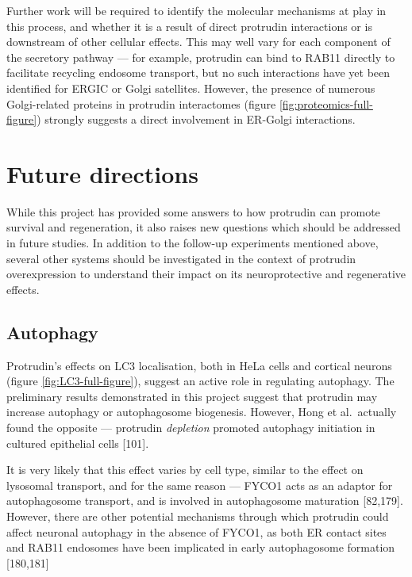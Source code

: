 \documentclass[
  12pt,
  a4paper,
]{book}
\begin{document}
Further work will be required to identify the molecular mechanisms at play in this process, and whether it is a result of direct protrudin interactions or is downstream of other cellular effects. This may well vary for each component of the secretory pathway --- for example, protrudin can bind to RAB11 directly to facilitate recycling endosome transport, but no such interactions have yet been identified for ERGIC or Golgi satellites. However, the presence of numerous Golgi-related proteins in protrudin interactomes (figure \ref{fig:proteomics-full-figure}) strongly suggests a direct involvement in ER-Golgi interactions.

\hypertarget{future-directions}{%
\section{Future directions}\label{future-directions}}

While this project has provided some answers to how protrudin can promote survival and regeneration, it also raises new questions which should be addressed in future studies. In addition to the follow-up experiments mentioned above, several other systems should be investigated in the context of protrudin overexpression to understand their impact on its neuroprotective and regenerative effects.

\hypertarget{autophagy}{%
\subsection{Autophagy}\label{autophagy}}

Protrudin's effects on LC3 localisation, both in HeLa cells and cortical neurons (figure \ref{fig:LC3-full-figure}), suggest an active role in regulating autophagy. The preliminary results demonstrated in this project suggest that protrudin may increase autophagy or autophagosome biogenesis. However, Hong et al.~actually found the opposite --- protrudin \emph{depletion} promoted autophagy initiation in cultured epithelial cells {[}101{]}.

It is very likely that this effect varies by cell type, similar to the effect on lysosomal transport, and for the same reason --- FYCO1 acts as an adaptor for autophagosome transport, and is involved in autophagosome maturation {[}82,179{]}. However, there are other potential mechanisms through which protrudin could affect neuronal autophagy in the absence of FYCO1, as both ER contact sites and RAB11 endosomes have been implicated in early autophagosome formation {[}180,181{]}
\end{document}
